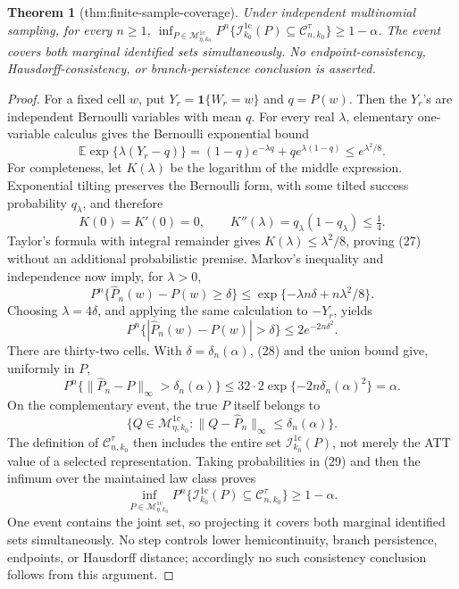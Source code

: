 \documentclass{article}
\newtheorem{theorem}{Theorem}
\begin{document}
\begin{theorem}[thm:finite-sample-coverage]\label{thm:finite-sample-coverage}
Under independent multinomial sampling, for every \(n\ge1\), \(\inf_{P\in\mathcal M_{\eta,k_0}^{1\mathrm c}}P^n\{\mathcal I_{k_0}^{1\mathrm c}(P)\subseteq\mathcal C_{n,k_0}^{\tau}\}\ge1-\alpha\). The event covers both marginal identified sets simultaneously. No endpoint-consistency, Hausdorff-consistency, or branch-persistence conclusion is asserted.
\end{theorem}
\begin{proof}
For a fixed cell \(w\), put \(Y_r=\mathbf 1\{W_r=w\}\) and \(q=P(w)\).  Then the \(Y_r\)'s are independent Bernoulli variables with mean \(q\).  For every real \(\lambda\), elementary one-variable calculus gives the Bernoulli exponential bound
\[
 \mathbb E\exp\{\lambda(Y_r-q)\}
 =(1-q)e^{-\lambda q}+qe^{\lambda(1-q)}
 \leq e^{\lambda^2/8}.
 \tag{27}
\]
For completeness, let \(K(\lambda)\) be the logarithm of the middle expression.  Exponential tilting preserves the Bernoulli form, with some tilted success probability \(q_\lambda\), and therefore
\[
 K(0)=K'(0)=0,
 \qquad K''(\lambda)=q_\lambda(1-q_\lambda)\leq\tfrac14.
\]
Taylor's formula with integral remainder gives \(K(\lambda)\leq\lambda^2/8\), proving (27) without an additional probabilistic premise.  Markov's inequality and independence now imply, for \(\lambda>0\),
\[
 P^n\{\widehat P_n(w)-P(w)\geq\delta\}
 \leq\exp\{-\lambda n\delta+n\lambda^2/8\}.
\]
Choosing \(\lambda=4\delta\), and applying the same calculation to \(-Y_r\), yields
\[
 P^n\{|\widehat P_n(w)-P(w)|>\delta\}\leq2e^{-2n\delta^2}.
 \tag{28}
\]
There are thirty-two cells.  With \(\delta=\delta_n(\alpha)\), (28) and the union bound give, uniformly in \(P\),
\[
 P^n\{\|\widehat P_n-P\|_\infty>\delta_n(\alpha)\}
 \leq32\cdot2\exp\{-2n\delta_n(\alpha)^2\}=\alpha.
 \tag{29}
\]
On the complementary event, the true \(P\) itself belongs to
\[
 \{Q\in\mathcal M_{\eta,k_0}^{1\mathrm c}:
 \|Q-\widehat P_n\|_\infty\leq\delta_n(\alpha)\}.
\]
The definition of \(\mathcal C_{n,k_0}^{\tau}\) then includes the entire set \(\mathcal I_{k_0}^{1\mathrm c}(P)\), not merely the ATT value of a selected representation.  Taking probabilities in (29) and then the infimum over the maintained law class proves
\[
 \inf_{P\in\mathcal M_{\eta,k_0}^{1\mathrm c}}
 P^n\{\mathcal I_{k_0}^{1\mathrm c}(P)
 \subseteq\mathcal C_{n,k_0}^{\tau}\}\geq1-\alpha.
\]
One event contains the joint set, so projecting it covers both marginal identified sets simultaneously.  No step controls lower hemicontinuity, branch persistence, endpoints, or Hausdorff distance; accordingly no such consistency conclusion follows from this argument.
\end{proof}
\end{document}
